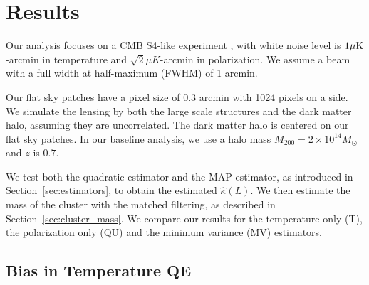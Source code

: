 \documentclass[prd, superscriptaddress, tightenlines, longbibliography, nofootinbib, eqsecnum, amsfonts, amsmath, floatfix, twocolumn, notitlepage]{revtex4-2}
\newcommand{\LL}[1]{{\color{orange}{LL: #1}}}
\begin{document}

\section{Results}
\label{sec:results}

Our analysis focuses on a CMB S4-like experiment \cite{CMB-S4:2016ple}, with white noise level is  $1 \mu \rm{K}$-arcmin in temperature and $\sqrt{2} \mu K$-arcmin in polarization. We assume a beam with a full width at half-maximum (FWHM) of 1 arcmin. 

Our flat sky patches have a pixel size of $0.3$ arcmin with 1024 pixels on a side. We simulate the lensing by both the large scale structures and the dark matter halo, assuming they are uncorrelated. The dark matter halo is centered on our flat sky patches. In our baseline analysis, we use  a halo mass $M_{200} = 2\times10^{14} M_{\odot}$ and $z$ is $0.7$. 

We test both the quadratic estimator and the MAP estimator, as introduced in Section~\ref{sec:estimators}, to obtain the estimated $\hat{\kappa}(L)$.
We then estimate the mass of the cluster with the matched filtering, as described in Section~\ref{sec:cluster_mass}. We compare our results for the temperature only (T), the polarization only (QU) and the minimum variance (MV) estimators.


\subsection{Bias in Temperature QE}
\end{document}

